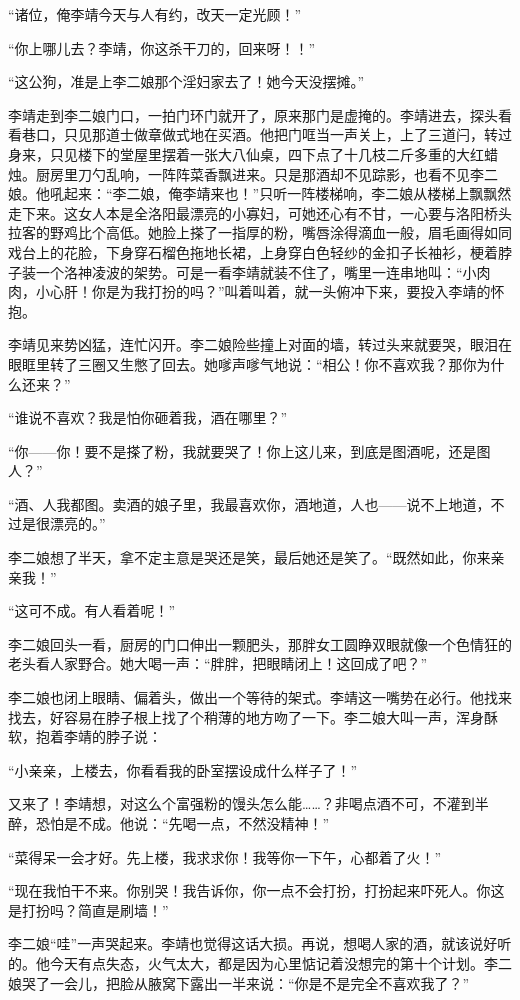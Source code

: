 “诸位，俺李靖今天与人有约，改天一定光顾！”

“你上哪儿去？李靖，你这杀干刀的，回来呀！！”

“这公狗，准是上李二娘那个淫妇家去了！她今天没摆摊。”

李靖走到李二娘门口，一拍门环门就开了，原来那门是虚掩的。李靖进去，探头看看巷口，只见那道士做章做式地在买酒。他把门哐当一声关上，上了三道闩，转过身来，只见楼下的堂屋里摆着一张大八仙桌，四下点了十几枝二斤多重的大红蜡烛。厨房里刀勺乱响，一阵阵菜香飘进来。只是那酒却不见踪影，也看不见李二娘。他吼起来：“李二娘，俺李靖来也！”只听一阵楼梯响，李二娘从楼梯上飘飘然走下来。这女人本是全洛阳最漂亮的小寡妇，可她还心有不甘，一心要与洛阳桥头拉客的野鸡比个高低。她脸上搽了一指厚的粉，嘴唇涂得滴血一般，眉毛画得如同戏台上的花脸，下身穿石榴色拖地长裙，上身穿白色轻纱的金扣子长袖衫，梗着脖子装一个洛神凌波的架势。可是一看李靖就装不住了，嘴里一连串地叫：“小肉肉，小心肝！你是为我打扮的吗？”叫着叫着，就一头俯冲下来，要投入李靖的怀抱。

李靖见来势凶猛，连忙闪开。李二娘险些撞上对面的墙，转过头来就要哭，眼泪在眼眶里转了三圈又生憋了回去。她嗲声嗲气地说：“相公！你不喜欢我？那你为什么还来？”

“谁说不喜欢？我是怕你砸着我，酒在哪里？”

“你——你！要不是搽了粉，我就要哭了！你上这儿来，到底是图酒呢，还是图人？”

“酒、人我都图。卖酒的娘子里，我最喜欢你，酒地道，人也——说不上地道，不过是很漂亮的。”

李二娘想了半天，拿不定主意是哭还是笑，最后她还是笑了。“既然如此，你来亲亲我！”

“这可不成。有人看着呢！”

李二娘回头一看，厨房的门口伸出一颗肥头，那胖女工圆睁双眼就像一个色情狂的老头看人家野合。她大喝一声：“胖胖，把眼睛闭上！这回成了吧？”

李二娘也闭上眼睛、偏着头，做出一个等待的架式。李靖这一嘴势在必行。他找来找去，好容易在脖子根上找了个稍薄的地方吻了一下。李二娘大叫一声，浑身酥软，抱着李靖的脖子说：

“小亲亲，上楼去，你看看我的卧室摆设成什么样子了！”

又来了！李靖想，对这么个富强粉的馒头怎么能……？非喝点酒不可，不灌到半醉，恐怕是不成。他说：“先喝一点，不然没精神！”

“菜得呆一会才好。先上楼，我求求你！我等你一下午，心都着了火！”

“现在我怕干不来。你别哭！我告诉你，你一点不会打扮，打扮起来吓死人。你这是打扮吗？简直是刷墙！”

李二娘“哇”一声哭起来。李靖也觉得这话大损。再说，想喝人家的酒，就该说好听的。他今天有点失态，火气太大，都是因为心里惦记着没想完的第十个计划。李二娘哭了一会儿，把脸从腋窝下露出一半来说：“你是不是完全不喜欢我了？”

